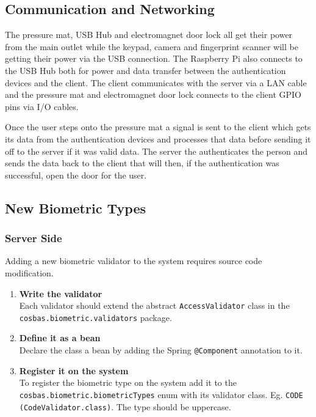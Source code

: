 \subsection{Communication and Networking}
The pressure mat, USB Hub and electromagnet door lock all get their power from the main outlet while the keypad, camera and fingerprint scanner will be getting their power via the USB connection. The Raspberry Pi also connects to the USB Hub both for power and data transfer between the authentication devices and the client. The client communicates with the server via a LAN cable and the pressure mat and electromagnet door lock connects to the client GPIO pins via I/O cables. 

Once the user steps onto the pressure mat a signal is sent to the client which gets its data from the authentication devices and processes that data before sending it off to the server if it was valid data. The server the authenticates the person and sends the data back to the client that will then, if the authentication was successful, open the door for the user.

\subsection{New Biometric Types}

\subsubsection{Server Side}
Adding a new biometric validator to the system requires source code modification. 
\begin{enumerate}
	\item \textbf{Write the validator} \\
	Each validator should extend the abstract \verb!AccessValidator! class in the \verb!cosbas.biometric.validators! package.
	\item \textbf{Define it as a bean} \\ 
	Declare the class a bean by adding the Spring  \verb!@Component! annotation to it.
	\item \textbf{Register it on the system} \\
	To register the biometric type on the system add it to the \verb!cosbas.biometric.biometricTypes! enum with its validator class. Eg. 
	\verb!CODE (CodeValidator.class)!. The type should be uppercase.
	
\end{enumerate}


